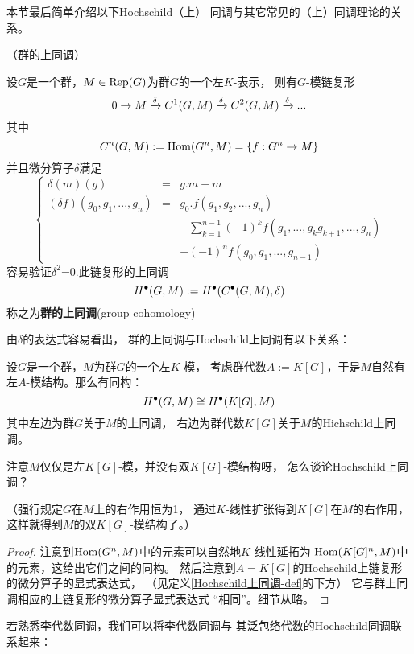 本节最后简单介绍以下Hochschild（上）
同调与其它常见的（上）同调理论的关系。

\begin{example}（群的上同调）%

设$G$是一个群，$M\in\operatorname{Rep}(G)$为群$G$的一个左$K$-表示，
则有$G$-模链复形
$$0\to M\xrightarrow{\delta}C^1(G,M)\xrightarrow{\delta}C^2(G,M)\xrightarrow{\delta}...$$
其中%
$$C^n(G,M):=\operatorname{Hom}(G^n,M)=\{f:G^n\to M\}$$
并且微分算子$\delta$满足%
$$\left\{\begin{array}{rcl}
\delta(m)(g)&=&g.m-m\\
(\delta f)(g_0,g_1,...,g_n)&=&
g_0.f(g_1,g_2,...,g_n)\\
&&-\sum\limits_{k=1}^{n-1}(-1)^kf(g_1,...,g_kg_{k+1},...,g_n)\\
&&-(-1)^nf(g_0,g_1,...,g_{n-1})
\end{array}\right.
$$
容易验证$\delta^2$=0.此链复形的上同调
$$H^{\bullet}(G,M):=H^{\bullet}(C^{\bullet}(G,M),\delta)$$
称之为\textbf{群的上同调}(group cohomology)
\end{example}

由$\delta$的表达式容易看出，
群的上同调与Hochschild上同调有以下关系：

\begin{prop}设$G$是一个群，$M$为群$G$的一个左$K$-模，
考虑群代数$A:=K[G]$，于是$M$自然有左$A$-模结构。那么有同构：
$$H^{\bullet}(G,M)\cong H^{\bullet}(K[G],M)$$
其中左边为群$G$关于$M$的上同调，
右边为群代数$K[G]$关于$M$的Hichschild上同调。
\end{prop}

{\color{red}
注意$M$仅仅是左$K[G]$-模，并没有双$K[G]$-模结构呀，
怎么谈论Hochschild上同调？

\color{purple}
（强行规定$G$在$M$上的右作用恒为1，
通过$K$-线性扩张得到$K[G]$在$M$的右作用，
这样就得到$M$的双$K[G]$-模结构了。）}

\begin{proof}
注意到$\operatorname{Hom}(G^n,M)$中的元素可以自然地$K$-线性延拓为
$\operatorname{Hom}(K[G]^n,M)$中的元素，这给出它们之间的同构。
然后注意到$A=K[G]$的Hochschild上链复形的微分算子的显式表达式，
（见定义\ref{Hochschild上同调-def}的下方）
它与群上同调相应的上链复形的微分算子显式表达式
“相同”。细节从略。
\end{proof}

若熟悉李代数同调，我们可以将李代数同调与
其泛包络代数的Hochschild同调联系起来：

